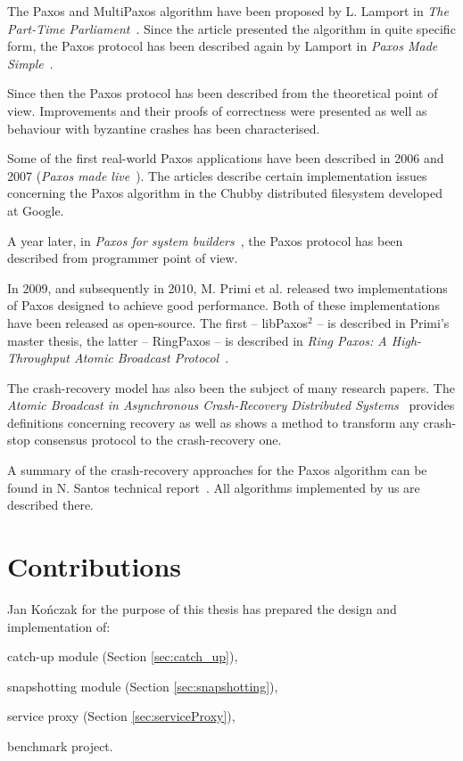 The Paxos and MultiPaxos algorithm have been proposed by L. Lamport in \textit{The Part-Time Parliament}~\cite{Lam98}. Since the article presented the algorithm in quite specific form, the Paxos protocol has been described again by Lamport in \textit{Paxos Made Simple}~\cite{Lam01}.

Since then the Paxos protocol has been described from the theoretical point of view. Improvements and their proofs of correctness were presented as well as behaviour with byzantine crashes has been characterised.

Some of the first real-world Paxos applications have been described in 2006 and 2007 (\textit{Paxos made live}~\cite{CGR07}). The articles describe certain implementation issues concerning the Paxos algorithm in the Chubby distributed filesystem developed at Google.

A year later, in \textit{Paxos for system builders}~\cite{AK08}, the Paxos protocol has been described from programmer point of view.

In 2009, and subsequently in 2010, M. Primi et al. released two implementations of Paxos designed to achieve good performance. Both of these implementations have been released as open-source. The first -- libPaxos$^2$ -- is described in Primi's master thesis, the latter -- RingPaxos -- is described in \textit{Ring Paxos: A High-Throughput Atomic Broadcast Protocol}~\cite{Mar10}.

The crash-recovery model has also been the subject of many research papers. The \textit{Atomic Broadcast in Asynchronous Crash-Recovery Distributed Systems}~\cite{rodriguez2000atomic} provides definitions concerning recovery as well as shows a method to transform any crash-stop consensus protocol to the crash-recovery one.

A summary of the crash-recovery approaches for the Paxos algorithm can be found in N. Santos technical report~\cite{Nun10}. All algorithms implemented by us are described there.

\section{Contributions}

Jan Kończak for the purpose of this thesis has prepared the design and implementation of:
\begin{tightList}
  \item[\textbullet] catch-up module (Section \ref{sec:catch_up}),
  \item[\textbullet] snapshotting module (Section \ref{sec:snapshotting}),
  \item[\textbullet] service proxy  (Section \ref{sec:serviceProxy}),
  \item[\textbullet] benchmark project.
\end{tightList}

